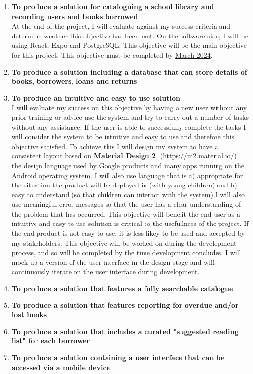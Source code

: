 \documentclass[../../../main.tex]{subfiles}
\begin{document}
\begin{enumerate}
    \item \textbf{To produce a solution for cataloguing a school library and recording users and books borrowed}\\
          At the end of the project, I will evaluate against my success criteria and determine weather this objective has been met.
          On the software side, I will be using React, Expo and PostgreSQL. This objective will be the main objective for this project.
          This objective must be completed by \underline{March 2024}.

    \item \textbf{To produce a solution including a database that can store details of books, borrowers, loans and returns}\\

    \item \textbf{To produce an intuitive and easy to use solution}\\
          I will evaluate my success on this objective by having a new user without any prior training or advice use the system and
          try to carry out a number of tasks without any assistance. If the user is able to successfully complete the tasks
          I will consider the system to be intuitive and easy to use and therefore this objective satisfied.
          To achieve this I will design my system to have a consistent layout based on \textbf{Material Design 2}, (\url{https://m2.material.io/})
          the design language used by Google products and many apps running on the Android operating system. I will also use language that is
          a) appropriate for the situation the product will be deployed in (with young children) and b) easy to understand (so that children can interact with the system)
          I will also use meaningful error messages so that the user has a clear understanding of the problem that has occurred.
          This objective will benefit the end user as a intuitive and easy to use solution is critical to the usefullness of the project. If the end product is not easy to use, it is less likey to be used and accepted by my stakeholders.
          This objective will be worked on during the development process, and so will be completed by the time development concludes. I will mock-up a version of the user interface in the design stage and will continuously iterate on the user interface during development.

    \item \textbf{To produce a solution that features a fully searchable catalogue}

    \item \textbf{To produce a solution that features reporting for overdue and/or lost books}
    \item \textbf{To produce a solution that includes a curated "suggested reading list" for each borrower}
    \item \textbf{To produce a solution containing a user interface that can be accessed via a mobile device}
\end{enumerate}
\end{document}
